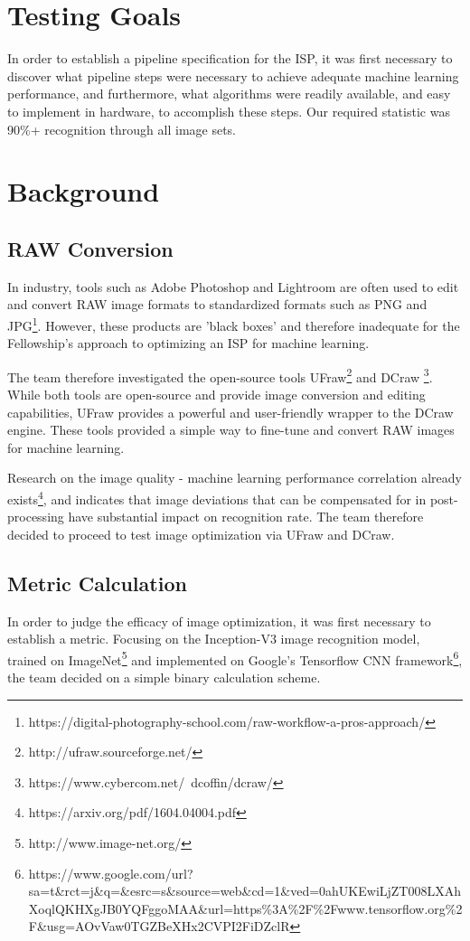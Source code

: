 \documentclass{report}
\begin{document}
	\section{Testing Goals}
	In order to establish a pipeline specification for the ISP, it was first necessary to discover what pipeline steps were necessary to achieve adequate machine learning performance, and furthermore, what algorithms were readily available, and easy to implement in hardware, to accomplish these steps. Our required statistic was 90\%+ recognition through all image sets.
	\section{Background}
		\subsection{RAW Conversion}
		In industry, tools such as Adobe Photoshop and Lightroom are often used to edit and convert RAW image formats to standardized formats such as PNG and JPG\footnote{https://digital-photography-school.com/raw-workflow-a-pros-approach/}. However, these products are 'black boxes' and therefore inadequate for the Fellowship's approach to optimizing an ISP for machine learning.
		
		The team therefore investigated the open-source tools UFraw\footnote{http://ufraw.sourceforge.net/} and DCraw \footnote{https://www.cybercom.net/~dcoffin/dcraw/}. While both tools are open-source and provide image conversion and editing capabilities, UFraw provides a powerful and user-friendly wrapper to the DCraw engine. These tools provided a simple way to fine-tune and convert RAW images for machine learning. 
		
		Research on the image quality - machine learning performance correlation already exists\footnote{https://arxiv.org/pdf/1604.04004.pdf}, and indicates that image deviations that can be compensated for in post-processing have substantial impact on recognition rate. The team therefore decided to proceed to test image optimization via UFraw and DCraw.
		\subsection{Metric Calculation}
		In order to judge the efficacy of image optimization, it was first necessary to establish a metric. Focusing on the Inception-V3 image recognition model, trained on ImageNet\footnote{http://www.image-net.org/} and implemented on Google's Tensorflow CNN framework\footnote{https://www.google.com/url?sa=t\&rct=j\&q=\&esrc=s\&source=web\&cd=1\&ved=0ahUKEwiLjZT008LXAhXoqlQKHXgJB0YQFggoMAA\&url=https\%3A\%2F\%2Fwww.tensorflow.org\%2F\&usg=AOvVaw0TGZBeXHx2CVPI2FiDZclR}, the team decided on a simple binary calculation scheme.
		
\end{document}
